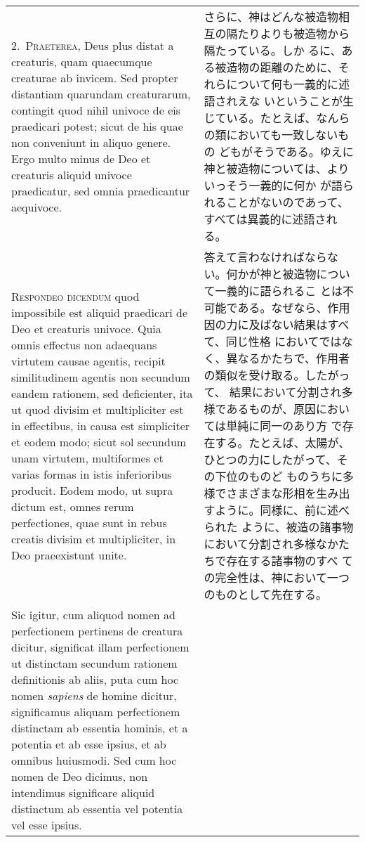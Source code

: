 \documentclass[paper=a4paper,fontsize=10pt,jafontsize=9pt,titlepage]{jlreq}
\begin{document}
\begin{longtable}{p{21em}p{21em}}
\\

2.~{\scshape Praeterea}, Deus plus distat a creaturis, quam quaecumque
creaturae ab invicem. Sed propter distantiam quarundam creaturarum,
contingit quod nihil univoce de eis praedicari potest; sicut de his
quae non conveniunt in aliquo genere. Ergo multo minus de Deo et
creaturis aliquid univoce praedicatur, sed omnia praedicantur
aequivoce.

&

さらに、神はどんな被造物相互の隔たりよりも被造物から隔たっている。しか
るに、ある被造物の距離のために、それらについて何も一義的に述語されえな
いということが生じている。たとえば、なんらの類においても一致しないもの
どもがそうである。ゆえに神と被造物については、よりいっそう一義的に何か
が語られることがないのであって、すべては異義的に述語される。

\\

{\scshape Respondeo dicendum} quod impossibile est aliquid praedicari de
Deo et creaturis univoce. Quia omnis effectus non adaequans virtutem
causae agentis, recipit similitudinem agentis non secundum eandem
rationem, sed deficienter, ita ut quod divisim et multipliciter est in
effectibus, in causa est simpliciter et eodem modo; sicut sol secundum
unam virtutem, multiformes et varias formas in istis inferioribus
producit. Eodem modo, ut supra dictum est, omnes rerum perfectiones,
quae sunt in rebus creatis divisim et multipliciter, in Deo
praeexistunt unite.

&

答えて言わなければならない。何かが神と被造物について一義的に語られるこ
とは不可能である。なぜなら、作用因の力に及ばない結果はすべて、同じ性格
においてではなく、異なるかたちで、作用者の類似を受け取る。したがって、
結果において分割され多様であるものが、原因においては単純に同一のあり方
で存在する。たとえば、太陽が、ひとつの力にしたがって、その下位のものど
ものうちに多様でさまざまな形相を生み出すように。同様に、前に述べられた
ように、被造の諸事物において分割され多様なかたちで存在する諸事物のすべ
ての完全性は、神において一つのものとして先在する。

\\

Sic igitur, cum aliquod nomen ad perfectionem pertinens de creatura
dicitur, significat illam perfectionem ut distinctam secundum rationem
definitionis ab aliis, puta cum hoc nomen {\itshape sapiens} de homine
dicitur, significamus aliquam perfectionem distinctam ab essentia
hominis, et a potentia et ab esse ipsius, et ab omnibus huiusmodi. Sed
cum hoc nomen de Deo dicimus, non intendimus significare aliquid
distinctum ab essentia vel potentia vel esse ipsius.


\end{longtable}
\end{document}
